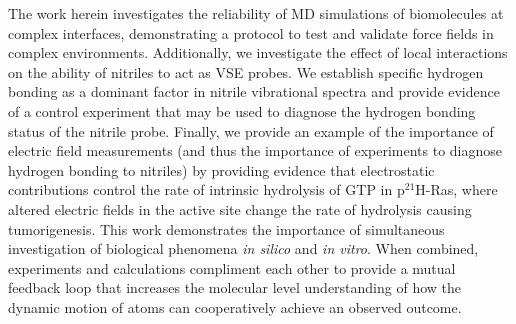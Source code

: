 The work herein investigates the reliability of MD simulations of biomolecules at complex interfaces, demonstrating a protocol to test and validate force fields in complex environments. 
Additionally, we investigate the effect of local interactions on the ability of nitriles to act as VSE probes. 
We establish specific hydrogen bonding as a dominant factor in nitrile vibrational spectra and provide evidence of a control experiment that may be used to diagnose the hydrogen bonding status of the nitrile probe. 
Finally, we provide an example of the importance of electric field measurements (and thus the importance of experiments to diagnose hydrogen bonding to nitriles) by providing evidence that electrostatic contributions control the rate of intrinsic hydrolysis of GTP in p$^{21}$H-Ras, where altered electric fields in the active site change the rate of hydrolysis causing tumorigenesis. 
This work demonstrates the importance of simultaneous investigation of biological phenomena \emph{in silico} and \emph{in vitro}. 
When combined, experiments and calculations compliment each other to provide a mutual feedback loop that increases the molecular level understanding of how the dynamic motion of atoms can cooperatively achieve an observed outcome. 
